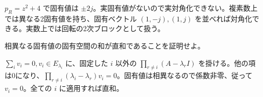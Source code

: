 \documentclass[11pt]{article}
\begin{document}
\begin{ans}
$p_R=z^2+4$ で固有値は $\pm2j$。実固有値がないので実対角化できない。複素数上では異なる2固有値を持ち、固有ベクトル $(1,-j),(1,j)$ を並べれば対角化できる。実数上では回転の2次ブロックとして扱う。
\end{ans}
\problem[固有空間の独立性]
相異なる固有値の固有空間の和が直和であることを証明せよ。
\begin{ans}
$\sum_i v_i=0,v_i\in E_{\lambda_i}$ に、固定した $i$ 以外の $\prod_{r\ne i}(A-\lambda_rI)$ を掛ける。他の項は0になり、$\prod_{r\ne i}(\lambda_i-\lambda_r)v_i=0$。固有値は相異なるので係数非零、従って $v_i=0$。全ての $i$ に適用すれば直和。
\end{ans}
\end{document}
